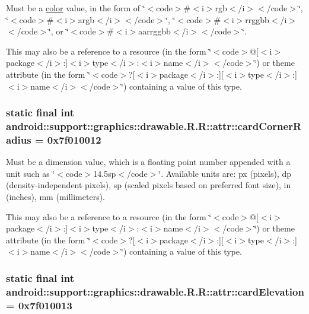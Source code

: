 Must be a \hyperlink{classandroid_1_1support_1_1graphics_1_1drawable_1_1_r_1_1color}{color} value, in the form of \char`\"{}$<$code$>$\#$<$i$>$rgb$<$/i$>$$<$/code$>$\char`\"{}, \char`\"{}$<$code$>$\#$<$i$>$argb$<$/i$>$$<$/code$>$\char`\"{}, \char`\"{}$<$code$>$\#$<$i$>$rrggbb$<$/i$>$$<$/code$>$\char`\"{}, or \char`\"{}$<$code$>$\#$<$i$>$aarrggbb$<$/i$>$$<$/code$>$\char`\"{}. 

This may also be a reference to a resource (in the form \char`\"{}$<$code$>$@\mbox{[}$<$i$>$package$<$/i$>$:\mbox{]}$<$i$>$type$<$/i$>$:$<$i$>$name$<$/i$>$$<$/code$>$\char`\"{}) or theme attribute (in the form \char`\"{}$<$code$>$?\mbox{[}$<$i$>$package$<$/i$>$:\mbox{]}\mbox{[}$<$i$>$type$<$/i$>$:\mbox{]}$<$i$>$name$<$/i$>$$<$/code$>$\char`\"{}) containing a value of this type. \hypertarget{classandroid_1_1support_1_1graphics_1_1drawable_1_1_r_1_1attr_51dfa632eb182abcdc702acd54e16c5a}{
\subsubsection[{cardCornerRadius}]{\setlength{\rightskip}{0pt plus 5cm}static final int android::support::graphics::drawable.R.R::attr::cardCornerRadius = 0x7f010012}}
\label{classandroid_1_1support_1_1graphics_1_1drawable_1_1_r_1_1attr_51dfa632eb182abcdc702acd54e16c5a}


Must be a dimension value, which is a floating point number appended with a unit such as \char`\"{}$<$code$>$14.5sp$<$/code$>$\char`\"{}. Available units are: px (pixels), dp (density-independent pixels), sp (scaled pixels based on preferred font size), in (inches), mm (millimeters). 

This may also be a reference to a resource (in the form \char`\"{}$<$code$>$@\mbox{[}$<$i$>$package$<$/i$>$:\mbox{]}$<$i$>$type$<$/i$>$:$<$i$>$name$<$/i$>$$<$/code$>$\char`\"{}) or theme attribute (in the form \char`\"{}$<$code$>$?\mbox{[}$<$i$>$package$<$/i$>$:\mbox{]}\mbox{[}$<$i$>$type$<$/i$>$:\mbox{]}$<$i$>$name$<$/i$>$$<$/code$>$\char`\"{}) containing a value of this type. \hypertarget{classandroid_1_1support_1_1graphics_1_1drawable_1_1_r_1_1attr_9a5cb4675e7d2e197e4139247ef01257}{
\subsubsection[{cardElevation}]{\setlength{\rightskip}{0pt plus 5cm}static final int android::support::graphics::drawable.R.R::attr::cardElevation = 0x7f010013}}
\label{classandroid_1_1support_1_1graphics_1_1drawable_1_1_r_1_1attr_9a5cb4675e7d2e197e4139247ef01257}


